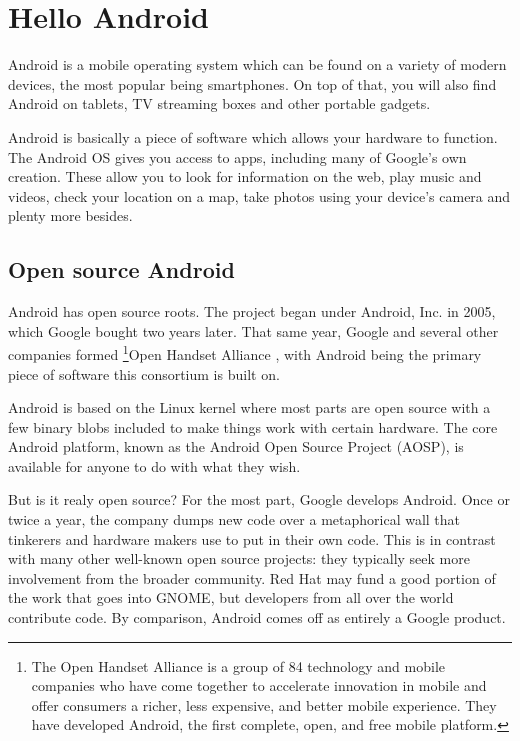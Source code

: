 
\chapter{Hello Android}
Android\cite{Todd2017} is a mobile operating system which can be found on a variety of modern devices, the most popular being smartphones.
On top of that, you will also find Android on tablets, TV streaming boxes and other portable gadgets.

Android is basically a piece of software which allows your hardware to function.
The Android OS gives you access to apps, including many of Google's own creation.
These allow you to look for information on the web, play music and videos, check your location on a map, take photos using your device's camera and plenty more besides.

\section{Open source Android}
Android has open source roots.
The project began under Android, Inc. in 2005, which Google bought two years later.
That same year, Google and several other companies formed  \footnote{The Open Handset Alliance is a group of 84 technology and mobile companies who have come together to accelerate innovation in mobile and offer consumers a richer, less expensive, and better mobile experience.
They have developed Android, the first complete, open, and free mobile platform.}{Open Handset Alliance} \cite{alliance}, with Android being the primary piece of software this consortium is built on.

Android is based on the Linux kernel where most parts are open source with a few binary blobs included to make things work with certain hardware.
The core Android platform, known as the Android Open Source Project (AOSP), is available for anyone to do with what they wish.

But is it realy open source?
For the most part, Google develops Android.
Once or twice a year, the company dumps  new code over a metaphorical wall that tinkerers and hardware makers use to put in their own code.
This is in contrast with many other well-known open source projects: they typically seek more involvement from the broader community.
Red Hat may fund a good portion of the work that goes into GNOME, but developers from all over the world contribute code.
By comparison, Android comes off as entirely a Google product.



